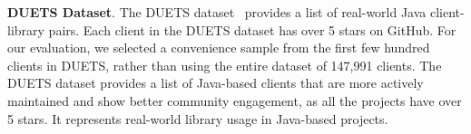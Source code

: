 \textbf{DUETS Dataset}. The DUETS dataset~\cite{durieux21:_duets} provides a list of real-world Java
client-library pairs. Each client in the DUETS dataset has over 5 stars on GitHub. For our evaluation,
we selected a convenience sample from the first few hundred clients in DUETS, rather than using the
entire dataset of 147,991 clients. The DUETS dataset provides a list of Java-based clients that are
more actively maintained and show better community engagement, as all the projects have over 5 stars.
It represents real-world library usage in Java-based projects.